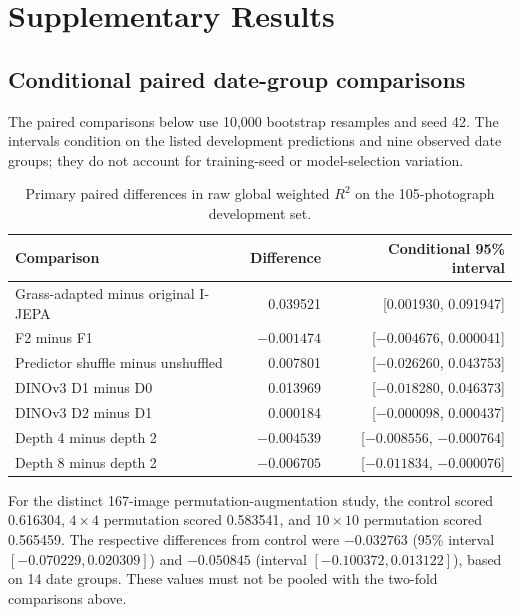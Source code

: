 \documentclass[pdflatex,a4paper,sn-nature]{sn-jnl}
\begin{document}
\section*{Supplementary Results}
\subsection*{Conditional paired date-group comparisons}
The paired comparisons below use 10,000 bootstrap resamples and seed 42. The intervals condition on the listed development predictions and nine observed date groups; they do not account for training-seed or model-selection variation.

\begin{table}[ht]
\centering
\caption{Primary paired differences in raw global weighted $R^2$ on the 105-photograph development set.}
\begin{tabular}{lrr}
\toprule Comparison & Difference & Conditional 95\% interval \\
\midrule
Grass-adapted minus original I-JEPA & 0.039521 & [0.001930, 0.091947] \\
F2 minus F1 & $-0.001474$ & [$-0.004676$, 0.000041] \\
Predictor shuffle minus unshuffled & 0.007801 & [$-0.026260$, 0.043753] \\
DINOv3 D1 minus D0 & 0.013969 & [$-0.018280$, 0.046373] \\
DINOv3 D2 minus D1 & 0.000184 & [$-0.000098$, 0.000437] \\
Depth 4 minus depth 2 & $-0.004539$ & [$-0.008556$, $-0.000764$] \\
Depth 8 minus depth 2 & $-0.006705$ & [$-0.011834$, $-0.000076$] \\
\bottomrule
\end{tabular}
\label{tab:s1}
\end{table}

For the distinct 167-image permutation-augmentation study, the control scored 0.616304, $4\times4$ permutation scored 0.583541, and $10\times10$ permutation scored 0.565459. The respective differences from control were $-0.032763$ (95\% interval $[-0.070229,0.020309]$) and $-0.050845$ (interval $[-0.100372,0.013122]$), based on 14 date groups. These values must not be pooled with the two-fold comparisons above.
\end{document}
